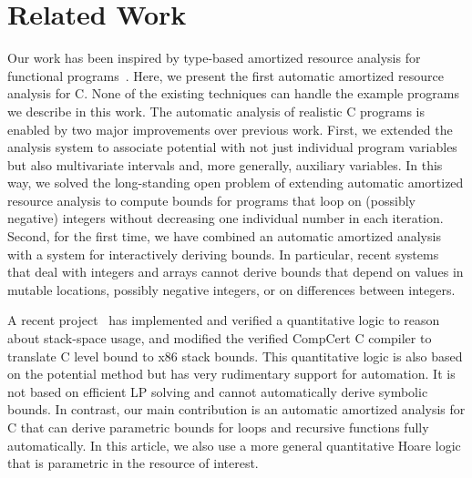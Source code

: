\documentclass[nocopyrightspace,preprint,pldi]{sigplanconf-pldi15}
\newcommand{\ifshort}[2]{\ifx\fullversion\undefined{#1}\else{#2}\fi}
\newcommand{\sectskip}[0]{\ifshort{\vspace{-3pt}}{}}
\newcommand{\aftersectskip}[0]{\ifshort{\vspace{-1pt}}{}}
\begin{document}
\sectskip
\section{Related Work}
\label{sec:related}
\aftersectskip

Our work has been inspired by type-based amortized resource analysis
for functional programs~\cite{Jost03,HoffmannH10,HoffmannAH12}.  Here,
we present the first automatic amortized resource analysis for
C. None of the existing techniques can handle the example programs we
describe in this work.
%
The automatic analysis of realistic C programs is enabled by two
major improvements over previous work.  First, we extended the
analysis system to associate potential with not just individual
program variables but also multivariate intervals
and, more generally, auxiliary variables.  In this way, we solved the
long-standing open problem of extending automatic amortized resource
analysis to compute bounds for programs that loop on (possibly
negative) integers without decreasing one individual number in each
iteration.  Second, for the first time, we have combined an automatic
amortized analysis with a system for interactively deriving bounds. In
particular, recent systems~\cite{HoffmannS13} that deal with integers
and arrays cannot derive bounds that depend on values in mutable
locations, possibly negative integers, or on differences between
integers.

A recent project~\cite{veristack14} has implemented and verified a
quantitative logic to reason about stack-space usage, and modified the
verified CompCert C compiler to translate C level bound to x86 stack
bounds.  This quantitative logic is also based on the potential method
but has very rudimentary support for automation. It is not based on
efficient LP solving and cannot automatically derive symbolic
bounds.  In contrast, our main contribution is an automatic amortized
analysis for C that can derive parametric bounds for loops and
recursive functions fully automatically.
%
In this article, we also use a more general quantitative Hoare
logic that is parametric in the resource of interest.
\end{document}
